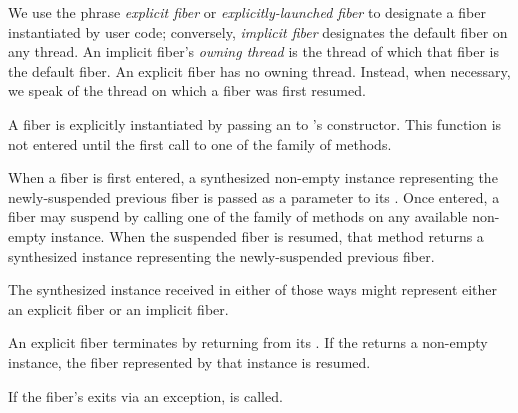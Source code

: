 We use the phrase \emph{explicit fiber} or \emph{explicitly-launched fiber} to
designate a fiber instantiated by user code; conversely, \emph{implicit fiber}
designates the default fiber on any thread. An implicit fiber's \emph{owning
thread} is the thread of which that fiber is the default fiber. An explicit
fiber has no owning thread. Instead, when necessary, we speak of the thread on
which a fiber was first resumed.

A fiber is explicitly instantiated by passing an \emph{\entryfn} to \fiber's
constructor. This function is not entered until the first call to one of
the  family of methods.

When a fiber is first entered, a synthesized non-empty \fiber instance
representing the newly-suspended previous fiber is passed as a parameter to
its \entryfn. Once entered, a fiber may suspend by calling one of the \resume
family of methods on any available non-empty \fiber instance. When the
suspended fiber is resumed, that method returns a synthesized \fiber instance
representing the newly-suspended previous fiber.

The synthesized \fiber instance received in either of those ways might
represent either an explicit fiber or an implicit fiber.

An explicit fiber terminates by returning from its \entryfn. If the \entryfn
returns a non-empty \fiber instance, the fiber represented by that \fiber
instance is resumed.



If the fiber's \entryfn exits via an exception,  is called.


